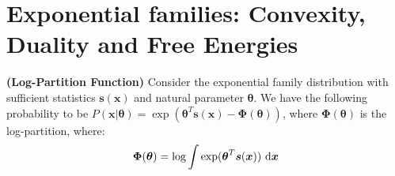 \section{Exponential families: Convexity, Duality and Free Energies}

\begin{definition}{\textbf{(Log-Partition Function)}}
    Consider the exponential family distribution with sufficient statistics $\boldsymbol s(\boldsymbol x)$ and natural parameter $\boldsymbol \theta$. We have the following probability to be $P(\boldsymbol x| \boldsymbol \theta) = \exp(\boldsymbol \theta^T\boldsymbol s(\boldsymbol x) - \boldsymbol \Phi(\boldsymbol \theta))$, where $\boldsymbol \Phi(\boldsymbol \theta)$ is the log-partition, where:
    \begin{equation*}
        \boldsymbol \Phi(\boldsymbol \theta) = \log \int \exp(\boldsymbol \theta^T\boldsymbol s(\boldsymbol x))\ \mathrm{d} \boldsymbol x
    \end{equation*}
\end{definition}

